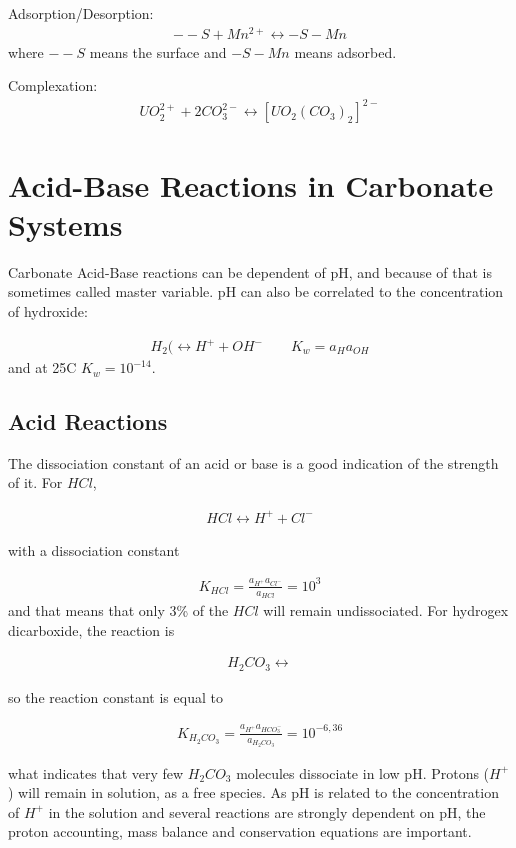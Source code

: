 \documentclass[11pt,twoside]{report}
\begin{document}
Adsorption/Desorption:
\begin{align}
   --S + Mn^{2+} \longleftrightarrow -S-Mn
\end{align}
where $--S$ means the surface and $-S-Mn$ means adsorbed.

Complexation:
\begin{align}
   UO_{2}^{2+} + 2CO_{3}^{2-} \longleftrightarrow [UO_{2}(CO_{3})_{2}]^{2-}
\end{align}

\section{Acid-Base Reactions in Carbonate Systems}
Carbonate Acid-Base reactions can be dependent of pH, and because of that is sometimes called master variable. pH can also be correlated to the concentration of hydroxide:

\begin{align}
   H_{2}( \longleftrightarrow H^{+} + OH^{-} \qquad K_{w} = a_{H}a_{OH}
\end{align}
and at 25C $K_{w} = 10^{-14}$.

\subsection{Acid Reactions}
The dissociation constant of an acid or base is a good indication of the strength of it. For $HCl$,

\begin{align}
   HCl \longleftrightarrow H^{+} + Cl^{-}
\end{align}

with a dissociation constant

\begin{align}
   K_{HCl} = \frac{a_{H^{+}}a_{Cl^{-}}}{a_{HCl}} = 10^{3}
\end{align}
and that means that only 3\% of the $HCl$ will remain undissociated. For hydrogex dicarboxide, the reaction is 

\begin{align}
   H_{2}CO_{3} \longleftrightarrow
\end{align}

so the reaction constant is equal to

\begin{align}
   K_{H_{2}CO_{3}} = \frac{a_{H^{+}}a_{HCO_{3}^{-}}}{a_{H_{2}CO_{3}}} = 10^{-6,36}
\end{align}

what indicates that very few $H_{2}CO_{3}$ molecules dissociate in low pH. Protons ($H^{+}$) will remain in solution, as a free species. As pH is related to the concentration of $H^{+}$ in the solution and several reactions are strongly dependent on pH, the proton accounting, mass balance and conservation equations are important. 
\end{document}
